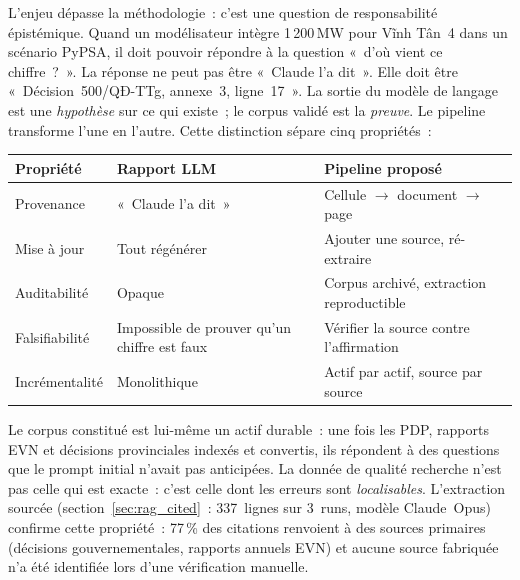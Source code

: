 \documentclass[a4paper,11pt]{report}
\begin{document}
L'enjeu dépasse la méthodologie~: c'est une question de responsabilité épistémique. Quand un modélisateur intègre 1\,200\,MW pour Vĩnh Tân~4 dans un scénario PyPSA, il doit pouvoir répondre à la question «~d'où vient ce chiffre~?~». La réponse ne peut pas être «~Claude l'a dit~». Elle doit être «~Décision~500/QĐ-TTg, annexe~3, ligne~17~». La sortie du modèle de langage est une \emph{hypothèse} sur ce qui existe~; le corpus validé est la \emph{preuve}. Le pipeline transforme l'une en l'autre. Cette distinction sépare cinq propriétés~:

\begin{center}
\small
\begin{tabular}{lll}
\toprule
\textbf{Propriété} & \textbf{Rapport LLM} & \textbf{Pipeline proposé} \\
\midrule
Provenance     & «~Claude l'a dit~» & Cellule $\to$ document $\to$ page \\
Mise à jour    & Tout régénérer      & Ajouter une source, ré-extraire \\
Auditabilité   & Opaque              & Corpus archivé, extraction reproductible \\
Falsifiabilité & Impossible de prouver qu'un chiffre est faux & Vérifier la source contre l'affirmation \\
Incrémentalité & Monolithique        & Actif par actif, source par source \\
\bottomrule
\end{tabular}
\end{center}

\noindent Le corpus constitué est lui-même un actif durable~: une fois les PDP, rapports EVN et décisions provinciales indexés et convertis, ils répondent à des questions que le prompt initial n'avait pas anticipées. La donnée de qualité recherche n'est pas celle qui est exacte~: c'est celle dont les erreurs sont \emph{localisables}. L'extraction sourcée (section~\ref{sec:rag_cited}~: 337~lignes sur 3~runs, modèle Claude~Opus) confirme cette propriété~: 77\,\% des citations renvoient à des sources primaires (décisions gouvernementales, rapports annuels EVN) et aucune source fabriquée n'a été identifiée lors d'une vérification manuelle.
\end{document}
